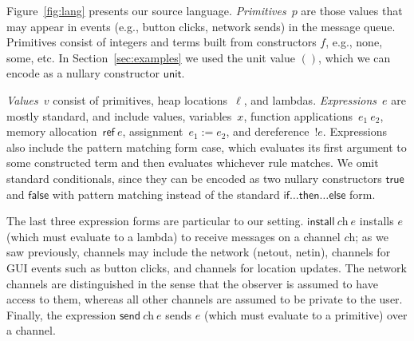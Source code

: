 \documentclass[conference]{IEEEtran}
\theoremstyle{definition}
\newcommand{\sfmt}[1]{\textsf{#1}}
\newcommand{\sch}{\textit{ch}}
\newcommand{\loc}{\ell}
\newcommand{\sassign}[2]{#1 := #2}
\newcommand{\sderef}[1]{!#1}
\newcommand{\sfalse}{\sfmt{false}}
\newcommand{\sinstall}[2]{\sfmt{install}~#1~#2}
\newcommand{\sref}[1]{\sfmt{ref}~#1}
\newcommand{\ssend}[2]{\sfmt{send}~#1~#2}
\newcommand{\strue}{\sfmt{true}}
\newcommand{\sunit}{\sfmt{unit}}
\newcommand{\xv}{p}
\begin{document}
Figure~\ref{fig:lang} presents our source language.
\emph{Primitives}~$\xv$ are those values that may appear in events
(e.g., button clicks, network sends) in the message queue. Primitives
consist of integers and terms built from constructors $f$, e.g.,
\sfmt{none}, \sfmt{some}, etc. In Section~\ref{sec:examples} we used
the unit value $()$, which we can encode as a nullary constructor
$\sunit$.

\emph{Values}~$v$ consist of primitives, heap locations~$\loc$, and
lambdas. \emph{Expressions}~$e$ are mostly standard, and include
values, variables~$x$, function applications~$e_1~e_2$, memory
allocation~$\sref{e}$, assignment~$\sassign{e_1}{e_2}$, and
dereference~$\sderef{e}$.  Expressions also include the pattern
matching form \sfmt{case}, which evaluates its first argument to some
constructed term and then evaluates whichever rule matches. We omit
standard conditionals, since they can be encoded as two nullary
constructors $\strue$ and $\sfalse$ with pattern matching instead of the
standard $\sfmt{if}\ldots\sfmt{then}\ldots\sfmt{else}$ form.

The last three expression forms are particular to our
setting. $\sinstall{\sch}{e}$ installs $e$ (which must evaluate to a
lambda) to receive messages on a channel $\sch$; as we saw previously,
channels may include the network (\sfmt{netout}, \sfmt{netin}),
channels for GUI events such as button clicks, and channels for
location updates. The network channels are distinguished in the sense
that the observer is assumed to have access to them, whereas all
other channels are assumed to be private to the user. Finally, the
expression $\ssend{\sch}{e}$ sends $e$ (which must evaluate to a
primitive) over a channel.
\end{document}
